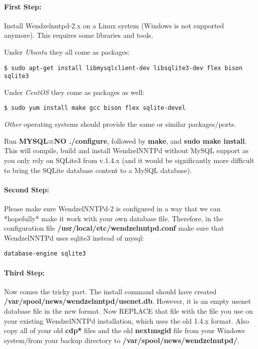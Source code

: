 \paragraph*{First Step:} Install Wendzelnntpd-2.x on a Linux system (Windows is not supported anymore). This requires some libraries and tools.

Under \textit{Ubuntu} they all come as packages:
\begin{verbatim}
$ sudo apt-get install libmysqlclient-dev libsqlite3-dev flex bison sqlite3
\end{verbatim}

Under \textit{CentOS} they come as packages as well:
\begin{verbatim}
$ sudo yum install make gcc bison flex sqlite-devel
\end{verbatim}

\textit{Other} operating systems should provide the same or similar packages/ports.

Run \textbf{MYSQL=NO ./configure}, followed by \textbf{make}, and \textbf{sudo make install}. This will compile, build and install WendzelNNTPd without MySQL support as you only rely on SQLite3 from v.1.4.x (and it would be significantly more difficult to bring the SQLite database content to a MySQL database).

\paragraph*{Second Step:} Please make sure WendzelNNTPd-2 is configured in a way that we can *hopefully* make it work with your own database file. Therefore, in the configuration file \textbf{/usr/local/etc/wendzelnntpd.conf} make sure that WendzelNNTPd uses sqlite3 instead of mysql:

\begin{verbatim}
database-engine sqlite3
\end{verbatim}

\paragraph*{Third Step:}
Now comes the tricky part. The install command should have created
\textbf{/var/spool/news/wendzelnntpd/usenet.db}.
However, it is an empty usenet database file in the new format.
Now REPLACE that file with the file you use on your existing WendzelNNTPd installation, which uses the old 1.4.x format. Also copy all of your old \textbf{cdp*} files and the old \textbf{nextmsgid} file from your Windows system/from your backup directory to \textbf{/var/spool/news/wendzelnntpd/}.

